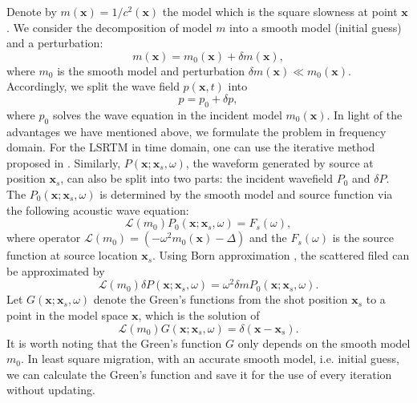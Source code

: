 \documentclass[11pt,titlepage]{article}
\newcommand{\cL}{\mathcal{L}}
\newcommand{\bx}{\boldsymbol{x}}
\theoremstyle{plain}
\theoremstyle{definition}
\theoremstyle{remark}
\numberwithin{equation}{section}
\begin{document}
Denote by $m(\bx)=1/c^2(\bx)$ the model which is the square slowness at point $\bx$. We consider the decomposition of model $m$ into a smooth model (initial guess) and a perturbation:
\begin{equation}
m(\bx)=m_0(\bx)+\delta m(\bx),
\end{equation} 
where $m_0$ is the smooth model and perturbation $\delta m(\bx) \ll m_0(\bx)$. Accordingly, we split the wave field $p(\bx,t)$ into 
\begin{equation}
p=p_0+\delta p,
\end{equation}
where $p_0$ solves the wave equation in the incident model $m_0(\bx)$. In light of the advantages we have mentioned above, we formulate the problem in frequency domain. For the LSRTM in time domain, one can use the iterative method proposed in \cite{Dong:2012aa}. Similarly, $P(\bx;\bx_s, \omega)$, the waveform generated by source at position $\bx_s$, can also be split into two parts: the incident wavefield $P_0$ and $\delta P$. The $P_0(\bx; \bx_s, \omega)$ is determined by the smooth model and source function via the following acoustic wave equation:
\begin{equation}
\cL( m_0) P_0(\bx; \bx_s, \omega)=F_s(\omega),
\end{equation} 
where operator $\cL( m_0)=(-\omega^2 m_0(\bx)-\Delta)$ and the $F_s(\omega)$ is the source function at source location $\bx_s$. Using Born approximation \cite{Tarantola:1988aa}, the scattered filed can be approximated by  
\begin{equation}
\cL( m_0)\delta P(\bx;\bx_s,\omega) =\omega^2 \delta m P_0(\bx;\bx_s,\omega).
\end{equation}
Let $G(\bx; \bx_s, \omega)$ denote the Green's functions from the shot position $\bx_s$ to a point in the model space $\bx$, which is the solution of 
\begin{equation}
\cL(m_0)G(\bx;\bx_s,\omega)=\delta(\bx-\bx_s).
\end{equation}
It is worth noting that the Green's function $G$ only depends on the smooth model $m_0$. In least square migration, with an accurate smooth model, i.e. initial guess, we can calculate the Green's function and save it for the use of every iteration without updating. 
  
\end{document}
